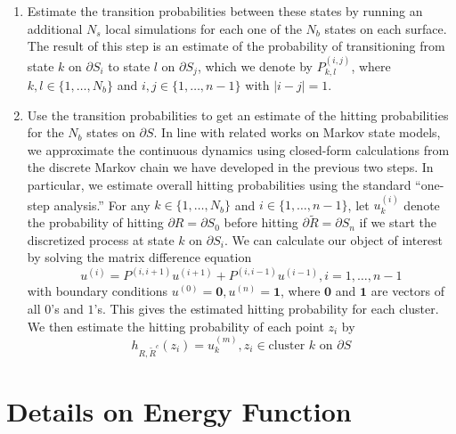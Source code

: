 \documentclass[nofootinbib,english, aip, jcp, priprint, graphicx,floatfix]{revtex4-1}
\theoremstyle{plain}
\theoremstyle{definition}
\theoremstyle{plain}
\begin{document}
{{\begin{enumerate}
\begin{enumerate}
  \item For each one of the surfaces $\partial S_1, \ldots, \partial S_{n -
  1}$, cluster the $N_p$ samples on that surface into $N_b \,$ states. 
\end{enumerate}

The result of this step is a partitioning of each shell $\partial S_i$ into
$N_b$ discrete regions. 

\item Estimate the transition probabilities between these states by running an additional $N_s$ local simulations for each one of the $N_b$ states on each surface. The result of this step is an estimate of the probability of transitioning from state $k$ on $\partial S_i$ to state $l$ on $\partial S_j$, which we denote by $P^{(i, j)}_{k, l}$, where $k, l \in \{ 1, \ldots, N_b \}$ and $i, j \in \{ 1, \ldots, n - 1 \}$ with $| i - j | = 1$.
  
\item Use the transition probabilities to get an estimate of the hitting probabilities for the $N_b$ states on
  $\partial S$.  In line with related works on Markov state models,\cite{Pande2010-yi, Chodera2014-bh, Husic2018-xp} we  approximate the continuous dynamics using closed-form calculations from the discrete Markov chain we have developed in the previous two steps.  In particular, we estimate overall hitting probabilities using the standard ``one-step analysis.'' For any $k \in \{ 1, \ldots, N_b \}$ and $i \in \{ 1, \ldots, n - 1 \}$, let $u^{(i)}_k$ denote the probability of hitting $\partial R = \partial S_0$ before hitting $\partial \tilde{R} = \partial S_n$ if we start the discretized process at state $k$ on $\partial S_i$.  We can calculate our object of interest by solving the matrix difference equation \[ u^{(i)} = P^{(i, i + 1)} u^{(i + 1)} + P^{(i, i - 1)} u^{(i - 1)}, i = 1, \ldots, n - 1 \] with boundary conditions $u^{(0)} = {\mathbf{0}}, u^{(n)} = {\mathbf{1} }$, where ${\mathbf{0}}$ and ${\mathbf{1}}$ are vectors of all $0$'s and $1$'s. This gives the estimated hitting probability for each cluster.  We then estimate the hitting probability of each point $z_i$ by
  \begin{equation}
      \label{equ:hitprobest}
  h_{R,\tilde R^c}(z_i) = u^{(m)}_k, z_i \in \text{cluster }k\text{ on }\partial S\end{equation}
\end{enumerate}
}}

%
%
%
%
%
%
%
%
%

\section{Details on Energy Function} \label{sec:energy_function}
\end{document}

